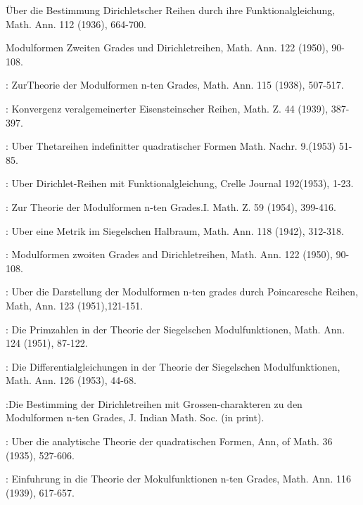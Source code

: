 \begin{thebibliography}{99}
 \"Uber die Bestimmung Dirichletscher Reihen durch
  ihre Funktionalgleichung, Math. Ann. 112    (1936), 664-700. 

 Modulformen Zweiten Grades und Dirichletreihen,
  Math. Ann. 122   (1950), 90-108. 
\end{thebibliography}

\begin{thebibliography}{99}
: Zur\pageoriginale Theorie der Modulformen
  n-ten Grades, Math. Ann. 115 (1938), 507-517.  

: Konvergenz veralgemeinerter Eisensteinscher
  Reihen, Math. Z. 44  (1939), 387-397. 

: Uber Thetareihen indefinitter quadratischer
  Formen Math. Nachr. 9.(1953)  51-85. 

: Uber Dirichlet-Reihen mit
  Funktionalgleichung, Crelle Journal 192(1953), 1-23. 

: Zur Theorie der Modulformen n-ten
  Grades.I. Math. Z. 59   (1954), 399-416. 

: Uber eine Metrik im Siegelschen Halbraum,
  Math. Ann. 118   (1942), 312-318. 

: Modulformen zwoiten Grades and
  Dirichletreihen, Math. Ann. 122   (1950), 90-108. 

: Uber die Darstellung der Modulformen n-ten
  grades durch Poincaresche Reihen, Math, Ann. 123
  (1951),121-151. 

: Die Primzahlen in der Theorie der Siegelschen
  Modulfunktionen, Math. Ann. 124   (1951), 87-122. 

: Die Differentialgleichungen in der Theorie
  der Siegelschen Modulfunktionen, Math. Ann. 126   (1953), 44-68. 

:\pageoriginale Die Bestimming der
  Dirichletreihen mit Grossen-charakteren zu den Modulformen n-ten
  Grades, J. Indian Math. Soc. (in print).  

: Uber die analytische Theorie der
  quadratischen Formen,  Ann, of Math. 36   (1935), 527-606. 

: Einfuhrung in die Theorie der
  Mokulfunktionen n-ten Grades, Math. Ann. 116   (1939), 617-657. 


\end{thebibliography}
